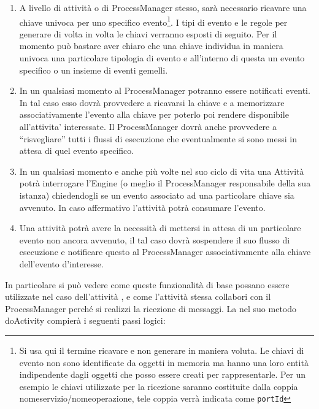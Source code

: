 \begin{enumerate}
  \item A livello di attività o di ProcessManager stesso,
  sarà necessario ricavare una chiave univoca per uno specifico 
  evento\footnote{Si usa qui il termine ricavare e non generare in maniera
  voluta. Le chiavi di evento non sono identificate da oggetti in memoria ma
  hanno una loro entità indipendente
  dagli oggetti che posso essere creati per rappresentarle. Per un esempio le
  chiavi utilizzate per la ricezione saranno costituite dalla coppia
  nomeservizio/nomeoperazione, tele coppia verrà indicata come
  \texttt{portId} }. I tipi di evento e le regole per generare di volta in volta 
  le chiavi verranno esposti di seguito. Per il momento può bastare aver
  chiaro che una chiave individua in maniera univoca una particolare tipologia di evento e all'interno di questa un evento specifico o un insieme
  di eventi gemelli.
  
  \item In un qualsiasi momento al ProcessManager potranno essere notificati
  eventi. In tal caso esso dovrà provvedere a ricavarsi la chiave e a
  memorizzare associativamente l'evento alla chiave per poterlo poi rendere
  disponibile all'attivita' interessate. Il ProcessManager dovrà anche
  provvedere a ``risvegliare'' tutti i flussi di esecuzione che
  eventualmente si sono messi in attesa di quel evento specifico.
   
  \item In un qualsiasi momento e anche più volte nel suo ciclo di vita una
  Attività potrà interrogare l'Engine (o meglio il ProcessManager responsabile
  della sua istanza) chiedendogli se un evento associato ad una particolare
  chiave sia avvenuto. In caso affermativo l'attività potrà consumare l'evento.

  \item Una attività potrà avere la necessità di mettersi in attesa di un
  particolare evento non ancora avvenuto, il tal caso dovrà sospendere il
  suo flusso di esecuzione e notificare questo al ProcessManager
  associativamente alla chiave dell'evento d'interesse. 
\end{enumerate}


In particolare si può vedere come queste funzionalità di base possano essere
utilizzate nel caso dell'attività , e come
l'attività stessa collabori con il ProcessManager perché si realizzi la
ricezione di messaggi. La  nel suo metodo doActivity
compierà i seguenti passi logici:

